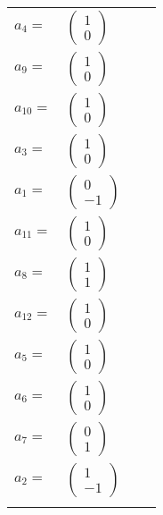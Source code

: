 \documentclass[1p]{elsarticle_modified}
\theoremstyle{definition}
\begin{document}
\begin{tabular}{m{7pt} m{180pt} m{7pt} m{180pt} }
\flushright $a_{4}=$&$\begin{pmatrix}1\\0\end{pmatrix}$ \\
\flushright $a_{9}=$&$\begin{pmatrix}1\\0\end{pmatrix}$ \\
\flushright $a_{10}=$&$\begin{pmatrix}1\\0\end{pmatrix}$ \\
\flushright $a_{3}=$&$\begin{pmatrix}1\\0\end{pmatrix}$ \\
\flushright $a_{1}=$&$\begin{pmatrix}0\\-1\end{pmatrix}$ \\
\flushright $a_{11}=$&$\begin{pmatrix}1\\0\end{pmatrix}$ \\
\flushright $a_{8}=$&$\begin{pmatrix}1\\1\end{pmatrix}$ \\
\flushright $a_{12}=$&$\begin{pmatrix}1\\0\end{pmatrix}$ \\
\flushright $a_{5}=$&$\begin{pmatrix}1\\0\end{pmatrix}$ \\
\flushright $a_{6}=$&$\begin{pmatrix}1\\0\end{pmatrix}$ \\
\flushright $a_{7}=$&$\begin{pmatrix}0\\1\end{pmatrix}$ \\
\flushright $a_{2}=$&$\begin{pmatrix}1\\-1\end{pmatrix}$\\&\end{tabular}
\end{document}
